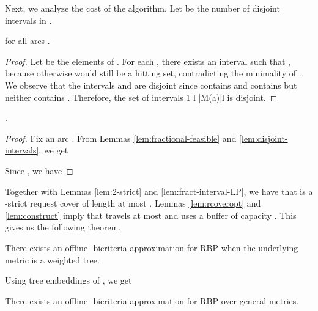 Next, we analyze the cost of the algorithm. Let  be the number
of disjoint intervals in .
\begin{lemma}
  \label{lem:disjoint-intervals}
   for all arcs .
\end{lemma}

\begin{proof}
  Let  be the elements of . For each
  , there exists an interval  such that , because otherwise  would still be
  a hitting set, contradicting the minimality of . We observe
  that the intervals  and  are
  disjoint since  contains  and
   contains  but neither contains
  . Therefore, the set of  intervals
  1 \leq l \leq |M(a)|l
  is disjoint.  
\end{proof}







\begin{lemma}
.
\end{lemma}

\begin{proof}
  Fix an arc . From Lemmas \ref{lem:fractional-feasible} and
  \ref{lem:disjoint-intervals}, we get
  
  Since , we have
   
\end{proof}






Together with Lemmas \ref{lem:2-strict} and
\ref{lem:fract-interval-LP}, we have that  is a
-strict request cover of length at most . Lemmas \ref{lem:rcoveropt} and \ref{lem:construct}
imply that  travels at most  and
uses a buffer of capacity . This gives us the following theorem.

\begin{theorem}
  \label{thm:trees}
  There exists an offline -bicriteria
  approximation for RBP when the underlying metric is a weighted tree.
\end{theorem}
Using tree embeddings of \cite{FRT}, we get
\begin{theorem}
  \label{thm:general}
  There exists an offline -bicriteria approximation for RBP over
  general metrics.
\end{theorem}